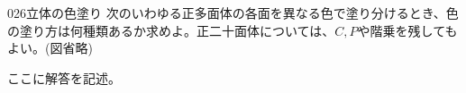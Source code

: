 \begin{prob}{026}{}{立体の色塗り}
 次のいわゆる正多面体の各面を異なる色で塗り分けるとき、色の塗り方は何種類あるか求めよ。正二十面体については、$C,P$や階乗を残してもよい。(図省略)
\end{prob}

ここに解答を記述。